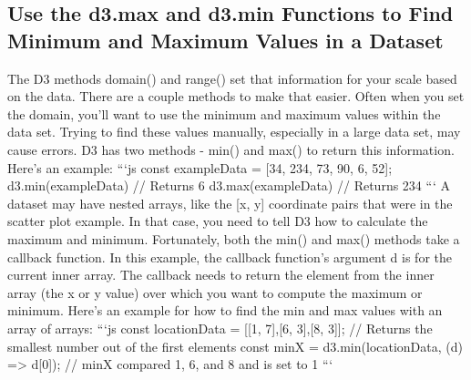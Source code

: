 \documentclass{article}%
\begin{document}
\subsection{Use the d3.max and d3.min Functions to Find Minimum and Maximum Values in a Dataset}%
\label{subsec:Usethed3.maxandd3.minFunctionstoFindMinimumandMaximumValuesinaDataset}%
The D3 methods domain() and range() set that information for your scale based on the data. There are a couple methods to make that easier.\newline%
Often when you set the domain, you'll want to use the minimum and maximum values within the data set. Trying to find these values manually, especially in a large data set, may cause errors.\newline%
D3 has two methods {-} min() and max() to return this information. Here's an example:\newline%
```js\newline%
const exampleData = {[}34, 234, 73, 90, 6, 52{]};\newline%
d3.min(exampleData) // Returns 6\newline%
d3.max(exampleData) // Returns 234\newline%
```\newline%
A dataset may have nested arrays, like the {[}x, y{]} coordinate pairs that were in the scatter plot example. In that case, you need to tell D3 how to calculate the maximum and minimum.\newline%
Fortunately, both the min() and max() methods take a callback function.\newline%
In this example, the callback function's argument d is for the current inner array. The callback needs to return the element from the inner array (the x or y value) over which you want to compute the maximum or minimum. Here's an example for how to find the min and max values with an array of arrays:\newline%
```js\newline%
const locationData = {[}{[}1, 7{]},{[}6, 3{]},{[}8, 3{]}{]};\newline%
// Returns the smallest number out of the first elements\newline%
const minX = d3.min(locationData, (d) => d{[}0{]});\newline%
// minX compared 1, 6, and 8 and is set to 1\newline%
```\newline%

%
\end{document}
